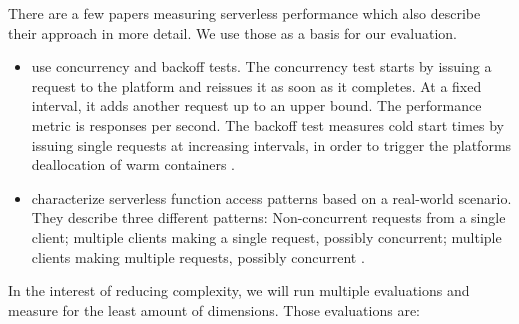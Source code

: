 



There are a few papers measuring serverless performance which also describe their approach in more detail. We use those as a basis for our evaluation.

\begin{itemize}
    \item \citeauthor{McGrath2017} use concurrency and backoff tests. The concurrency test starts by issuing a request to the platform and reissues it as soon as it completes. At a fixed interval, it adds another request up to an upper bound. The performance metric is responses per second. The backoff test measures cold start times by issuing single requests at increasing intervals, in order to trigger the platforms deallocation of warm containers \cite{McGrath2017}.
    \item \citeauthor{Hall2019} characterize serverless function access patterns based on a real-world scenario. They describe three different patterns: Non-concurrent requests from a single client; multiple clients making a single request, possibly concurrent; multiple clients making multiple requests, possibly concurrent \cite{Hall2019}.
\end{itemize}

In the interest of reducing complexity, we will run multiple evaluations and measure for the least amount of dimensions. Those evaluations are:


